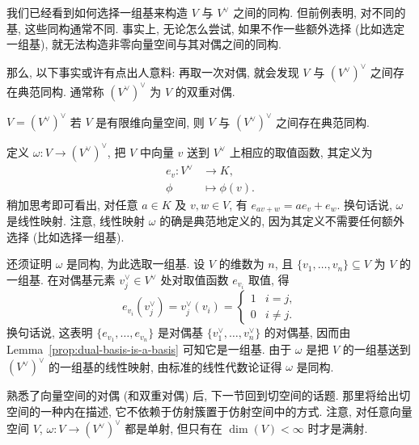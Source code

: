 我们已经看到如何选择一组基来构造 $V$ 与 $V^{\vee}$ 之间的同构. 但前例表明, 对不同的基, 这些同构通常不同. 事实上, 无论怎么尝试, 如果不作一些额外选择 (比如选定一组基), 就无法构造非零向量空间与其对偶之间的同构.

\BookPairedNote
  {那么, 以下事实或许有点出人意料: 再取一次对偶, 就会发现 $V$ 与 $(V^{\vee})^{\vee}$ 之间存在典范同构.}
  {通常称 $(V^{\vee})^{\vee}$ 为 $V$ 的\textquotedbl{}双重对偶\textquotedbl{}.}

\begin{Theorem}{$V=(V^{\vee})^{\vee}$}\leavevmode\label{thm:vector-space-canonically-isomorphic-to-double-dual}
若 $V$ 是有限维向量空间, 则 $V$ 与 $(V^{\vee})^{\vee}$ 之间存在典范同构.
\end{Theorem}
\begin{Proof}
定义 $\omega:V\to(V^{\vee})^{\vee}$, 把 $V$ 中向量 $v$ 送到 $V^{\vee}$ 上相应的\textquotedbl{}取值函数\textquotedbl{}, 其定义为
\[
  \begin{aligned}
    e_{v}:V^{\vee}&\to K,\\
    \phi&\mapsto\phi(v).
  \end{aligned}
\]
稍加思考即可看出, 对任意 $a\in K$ 及 $v,w\in V$, 有 $e_{av+w}=ae_{v}+e_{w}$. 换句话说, $\omega$ 是线性映射. 注意, 线性映射 $\omega$ 的确是典范地定义的, 因为其定义不需要任何额外选择 (比如选择一组基).

还须证明 $\omega$ 是同构, 为此选取一组基. 设 $V$ 的维数为 $n$, 且 $\{v_{1},\ldots,v_{n}\}\subseteq V$ 为 $V$ 的一组基. 在对偶基元素 $v_{j}^{\vee}\in V^{\vee}$ 处对取值函数 $e_{v_{i}}$ 取值, 得
\[
  e_{v_{i}}(v_{j}^{\vee})=v_{j}^{\vee}(v_{i})=
  \begin{cases}
    1 & i=j,\\
    0 & i\neq j.
  \end{cases}
\]
换句话说, 这表明 $\{e_{v_{1}},\ldots,e_{v_{n}}\}$ 是对偶基 $\{v_{1}^{\vee},\ldots,v_{n}^{\vee}\}$ 的对偶基, 因而由 Lemma~\ref{prop:dual-basis-is-a-basis} 可知它是一组基. 由于 $\omega$ 是把 $V$ 的一组基送到 $(V^{\vee})^{\vee}$ 的一组基的线性映射, 由标准的线性代数论证得 $\omega$ 是同构.
\end{Proof}

\BookPairedNoteLeft
  {熟悉了向量空间的对偶 (和双重对偶) 后, 下一节回到切空间的话题. 那里将给出切空间的一种内在描述, 它不依赖于仿射簇置于仿射空间中的方式.}
  {注意, 对任意向量空间 $V$, $\omega:V\to(V^{\vee})^{\vee}$ 都是单射, 但只有在 $\dim(V)<\infty$ 时才是满射.}

